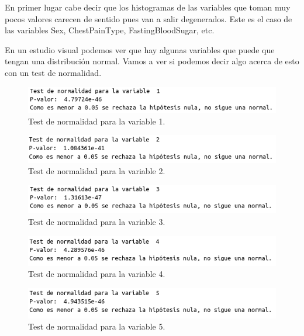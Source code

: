 \documentclass[12pt,a4paper]{article}
\begin{document}
En primer lugar cabe decir que los histogramas de las variables que toman muy pocos valores carecen de sentido pues van a salir degenerados. Este es el caso de las variables Sex, ChestPainType, FastingBloodSugar, etc.

En un estudio visual podemos ver que hay algunas variables que puede que tengan una distribución normal. Vamos a ver si podemos decir algo acerca de esto con un test de normalidad.

\begin{figure}[H]
	\centering
	\includegraphics[scale=0.6]{./Imagenes/EDA/Clasificacion/test_normalidad1.png}
	\caption{Test de normalidad para la variable 1.}
\end{figure}

\begin{figure}[H]
	\centering
	\includegraphics[scale=0.6]{./Imagenes/EDA/Clasificacion/test_normalidad2.png}
	\caption{Test de normalidad para la variable 2.}
\end{figure}

\begin{figure}[H]
	\centering
	\includegraphics[scale=0.6]{./Imagenes/EDA/Clasificacion/test_normalidad3.png}
	\caption{Test de normalidad para la variable 3.}
\end{figure}

\begin{figure}[H]
	\centering
	\includegraphics[scale=0.6]{./Imagenes/EDA/Clasificacion/test_normalidad4.png}
	\caption{Test de normalidad para la variable 4.}
\end{figure}

\begin{figure}[H]
	\centering
	\includegraphics[scale=0.6]{./Imagenes/EDA/Clasificacion/test_normalidad5.png}
	\caption{Test de normalidad para la variable 5.}
\end{figure}
\end{document}
